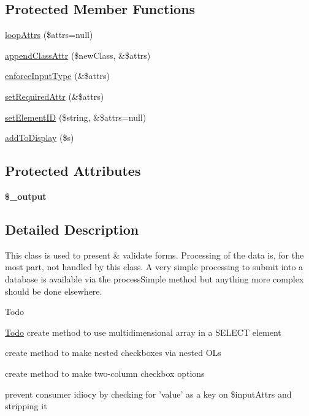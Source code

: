 \subsection*{Protected Member Functions}
\begin{DoxyCompactItemize}
\item 
\hyperlink{classg_form_a22382c8c914bf221b8a07bf06650b40c}{loop\-Attrs} (\$attrs=null)
\item 
\hyperlink{classg_form_a108c1c63fdefa8d71a9037070811cf9d}{append\-Class\-Attr} (\$new\-Class, \&\$attrs)
\item 
\hyperlink{classg_form_a9b9d092578cb0ca7b1eb97850d84f91b}{enforce\-Input\-Type} (\&\$attrs)
\item 
\hyperlink{classg_form_a5656e3ad9b30682d51468e926d0bc59b}{set\-Required\-Attr} (\&\$attrs)
\item 
\hyperlink{classg_form_a0d259672a0855f29d308835b306d5118}{set\-Element\-I\-D} (\$string, \&\$attrs=null)
\item 
\hyperlink{classg_form_ab28cc698b9f80045ef5aca2e8ed95667}{add\-To\-Display} (\$s)
\end{DoxyCompactItemize}
\subsection*{Protected Attributes}
\begin{DoxyCompactItemize}
\item 
\hypertarget{classg_form_a9d0ae9d0264ebd1aba5a9ca6c7385169}{{\bfseries \$\-\_\-output}}\label{classg_form_a9d0ae9d0264ebd1aba5a9ca6c7385169}

\end{DoxyCompactItemize}


\subsection{Detailed Description}
This class is used to present \& validate forms. Processing of the data is, for the most part, not handled by this class. A very simple processing to submit into a database is available via the process\-Simple method but anything more complex should be done elsewhere.

\begin{DoxyRefDesc}{Todo}
\item[\hyperlink{todo__todo000003}{Todo}]create method to use multidimensional array in a S\-E\-L\-E\-C\-T element 

create method to make nested checkboxes via nested O\-Ls 

create method to make two-\/column checkbox options 

prevent consumer idiocy by checking for 'value' as a key on \$input\-Attrs and stripping it\end{DoxyRefDesc}


